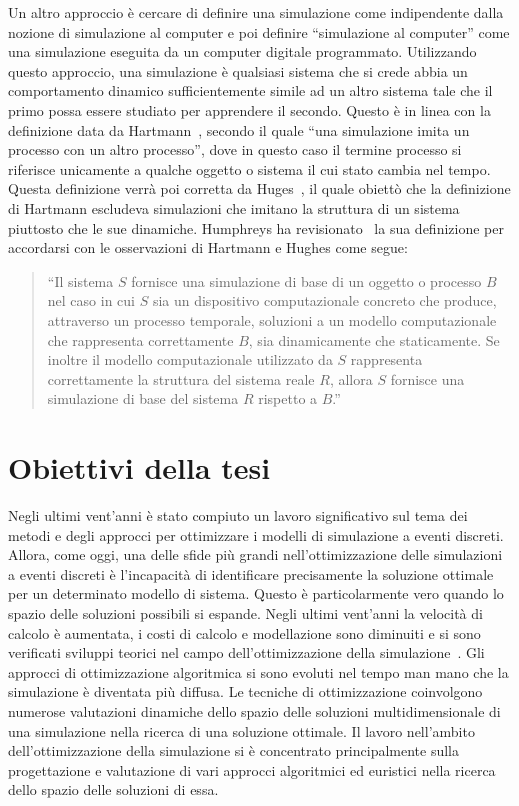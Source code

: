 \documentclass[12pt,a4paper,openright,twoside]{book}
\begin{document}
Un altro approccio è cercare di definire una simulazione come indipendente dalla nozione di simulazione al computer e poi definire ``simulazione al computer'' come una simulazione eseguita da un computer digitale programmato. Utilizzando questo approccio, una simulazione è qualsiasi sistema che si crede abbia un comportamento dinamico sufficientemente simile ad un altro sistema tale che il primo possa essere studiato per apprendere il secondo. Questo è in linea con la definizione data da Hartmann~\cite{Hartmann1996-HARTWA-2}, secondo il quale ``una simulazione imita un processo con un altro processo'', dove in questo caso il termine processo si riferisce unicamente a qualche oggetto o sistema il cui stato cambia nel tempo. Questa definizione verrà poi corretta da Huges~\cite{Hughes_1999}, il quale obiettò che la definizione di Hartmann escludeva simulazioni che imitano la struttura di un sistema piuttosto che le sue dinamiche. 
Humphreys ha revisionato~\cite{Humphreys2004-HUMEOC-2} la sua definizione per accordarsi con le osservazioni di Hartmann e Hughes come segue: 
\begin{quotation}
    ``Il sistema $S$ fornisce una simulazione di base di un oggetto o processo $B$ nel caso in cui $S$ sia un dispositivo computazionale concreto che produce, attraverso un processo temporale, soluzioni a un modello computazionale che rappresenta correttamente $B$, sia dinamicamente che staticamente. Se inoltre il modello computazionale utilizzato da $S$ rappresenta correttamente la struttura del sistema reale $R$, allora $S$ fornisce una simulazione di base del sistema $R$ rispetto a $B$.'' 
\end{quotation}


\section{Obiettivi della tesi}
Negli ultimi vent'anni è stato compiuto un lavoro significativo sul tema dei metodi e degli approcci per ottimizzare i modelli di simulazione a eventi discreti. Allora, come oggi, una delle sfide più grandi nell'ottimizzazione delle simulazioni a eventi discreti è l'incapacità di identificare precisamente la soluzione ottimale per un determinato modello di sistema. Questo è particolarmente vero quando lo spazio delle soluzioni possibili si espande.
Negli ultimi vent'anni la velocità di calcolo è aumentata, i costi di calcolo e modellazione sono diminuiti e si sono verificati sviluppi teorici nel campo dell'ottimizzazione della simulazione~\cite{DBLP:conf/scsc/Riley13}.
Gli approcci di ottimizzazione algoritmica si sono evoluti nel tempo man mano che la simulazione è diventata più diffusa. Le tecniche di ottimizzazione coinvolgono numerose valutazioni dinamiche dello spazio delle soluzioni multidimensionale di una simulazione nella ricerca di una soluzione ottimale. Il lavoro nell'ambito dell'ottimizzazione della simulazione si è concentrato principalmente sulla progettazione e valutazione di vari approcci algoritmici ed euristici nella ricerca dello spazio delle soluzioni di essa.
\end{document}
